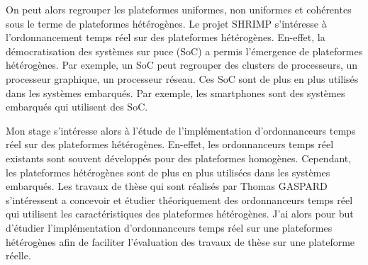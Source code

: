 On peut alors regrouper les plateformes uniformes, non uniformes et cohérentes sous le terme de plateformes hétérogènes. Le projet SHRIMP s'intéresse à l'ordonnancement temps réel sur des plateformes hétérogènes. En-effet, la démocratisation des systèmes sur puce (SoC) a permis l'émergence de plateformes hétérogènes. Par exemple, un SoC peut regrouper des clusters de processeurs, un processeur graphique, un processeur réseau. Ces SoC sont de plus en plus utilisés dans les systèmes embarqués. Par exemple, les smartphones sont des systèmes embarqués qui utilisent des SoC. 

Mon stage s'intéresse alors à l'étude de l'implémentation d'ordonnanceurs temps réel sur des plateformes hétérogènes. En-effet, les ordonnanceurs temps réel existants sont souvent développés pour des plateformes homogènes. Cependant, les plateformes hétérogènes sont de plus en plus utilisées dans les systèmes embarqués. Les travaux de thèse qui sont réalisés par Thomas GASPARD s'intéressent a concevoir et étudier théoriquement des ordonnanceurs temps réel qui utilisent les caractéristiques des plateformes hétérogènes. J'ai alors pour but d'étudier l'implémentation d'ordonnanceurs temps réel sur une plateformes hétérogènes afin de faciliter l'évaluation des travaux de thèse sur une plateforme réelle.






